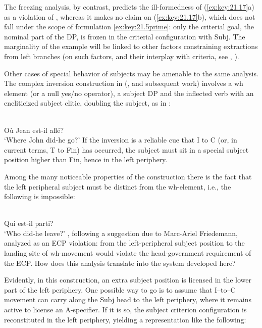 \documentclass[output=paper]{langsci/langscibook}
\begin{document}
\begin{exe}
The freezing analysis, by contrast, predicts the ill-formedness of
(\ref{ex:key:21.17}a) as a violation of , whereas it
makes no claim on (\ref{ex:key:21.17}b), which does not fall under the scope of
formulation  \eqref{ex:key:21.5prime}: only the criterial goal, the nominal
part of the DP, is frozen in the criterial configuration with Subj\tss{[$+$N]}.
The marginality of the example will be linked to other factors constraining
extractions from left branches (on such factors, and their interplay with
criteria, see \citealt{Lohndal2010}, \citealt{Berthelot2017}).

Other cases of special behavior of subjects may be amenable to the same
analysis. The complex inversion construction in 
(\citealt{Kayne1972,RizziRoberts1989}, and subsequent work) involves a wh
element (or a null yes/no operator), a subject DP and the inflected verb with
an encliticized subject clitic, doubling the subject, as in :

\ea%
    \label{ex:key:21.18}\\
    Où        Jean est-il allé?\\
         ‘Where John did-he go?’
\z
%
If the inversion is a reliable cue that I to C (or, in current terms, T to Fin)
has occurred, the subject must sit in a special subject position higher than
Fin, hence in the left periphery.

Among the many noticeable properties of the construction there is the fact that
the left peripheral subject must be distinct from the wh-element, i.e., the
following is impossible:

\ea%
    \label{ex:key:21.19}\\
    \llap{*}Qui    est-il  parti?\\
        ‘Who did-he leave?’
\z
%
\textcite{RizziRoberts1989}, following a suggestion due to Marc-Ariel
Friedemann, analyzed  as an \gls{ECP} violation:  from the left-peripheral subject position
to the landing site of wh-movement would violate the head-government
requirement of the \gls{ECP}. How does this analysis translate into the system
developed here?

Evidently, in this construction, an extra subject position is licensed in the
lower part of the left periphery. One possible way to go is to assume that
I--to--C movement can carry along the Subj head to the left periphery, where it
remains active to license an A-specifier. If it is so, the subject criterion
configuration is reconstituted in the left periphery, yielding a representation
like the following:


\end{exe}
\end{document}
